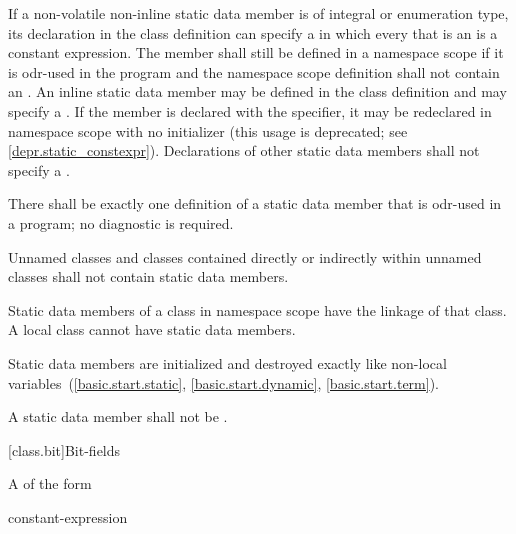 \pnum
If a non-volatile non-inline  static data member is
of integral or enumeration type,
its declaration in the class definition can specify a
 in which every
 that is an 
is a constant expression.
The member shall still be defined in a namespace scope if
it is odr-used in the program and the
namespace scope definition shall not contain an .
An inline static data member may be defined in the class definition
and may specify a . If the
member is declared with the  specifier, it may be
redeclared in namespace scope with no initializer (this usage is
deprecated; see \ref{depr.static_constexpr}). Declarations of other
static data members shall not specify a .

\pnum
\begin{note}
There shall be exactly one definition of a static data member
that is odr-used in a program; no diagnostic is required.
\end{note}
Unnamed classes and classes contained directly
or indirectly within unnamed classes shall not contain static
data members.

\pnum
\begin{note}
Static data members of a class in namespace scope have the linkage of that class. A local class cannot have static data members.
\end{note}

\pnum
Static data members are initialized and destroyed exactly like
non-local variables~(\ref{basic.start.static}, \ref{basic.start.dynamic},
\ref{basic.start.term}).

\pnum
A static data member shall not be
.

[class.bit]{Bit-fields}%

\pnum
A  of the form

\begin{ncsimplebnf}
  \terminal{:} constant-expression 
\end{ncsimplebnf}

